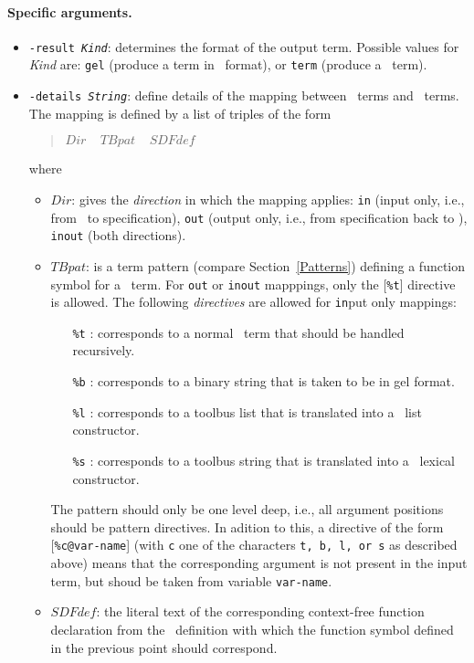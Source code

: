 \paragraph{Specific arguments.}
\begin{itemize}
\item {\tt -result {\em Kind}}: determines the format of the output term.
Possible values for {\em Kind} are: {\tt  gel} (produce a term in \GEL\ format),
or {\tt term} (produce a \TB\ term).

\item {\tt -details {\em String}}: define details of the mapping between
\TB\ terms and \ASFSDF\ terms. The mapping is defined by a list of triples
of the form
\begin{quote}
$Dir~~~~~TBpat~~~~~SDFdef$
\end{quote}
where
\begin{itemize}
\item $Dir$: gives the {\em direction} in which the mapping applies:
{\tt in} (input only, i.e., from \TB\ to specification),
{\tt out} (output only, i.e., from specification back to \TB),
{\tt inout} (both directions).
\item $TBpat$: is a term pattern (compare Section~\ref{Patterns}) defining
a function symbol for a \TB\ term. For {\tt out} or {\tt inout} mapppings,
only the [{\tt \%t}] directive is allowed. The following \emph{directives} are
allowed for {\tt in}put only mappings:
  \begin{itemize}
    \item [{\tt \%t}]: corresponds to a normal \TB\ term that should be handled
          recursively.
    \item [{\tt \%b}]: corresponds to a binary string that is taken to be
          in gel format.
    \item [{\tt \%l}]: corresponds to a toolbus list that is translated into
          a \ASFSDF\ list constructor.
    \item [{\tt \%s}]: corresponds to a toolbus string that is translated into
          a \ASFSDF\ lexical constructor.
  \end{itemize}
  The pattern should only be one level deep, i.e., all argument positions
  should be pattern directives.
  In adition to this, a directive of the form [{\tt \%c@var-name}] (with {\tt c}
  one of the characters {\tt t, b, l, or s} as described above) means
  that the corresponding argument is not present in the input term, but
  shoud be taken from variable {\tt var-name}.

  \item $SDFdef$: the literal text of the corresponding context-free function
  declaration from the \ASFSDF\ definition with which the function symbol
  defined in the previous point should correspond.
  \end{itemize}
\end{itemize}
